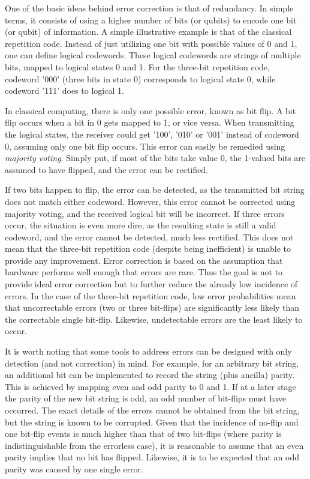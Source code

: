 One of the basic ideas behind error correction is that of redundancy. In simple terms, it consists of using a higher number of bits (or qubits) to encode one bit (or qubit) of information. A simple illustrative example is that of the classical repetition code. Instead of just utilizing one bit with possible values of 0 and 1, one can define logical codewords. These logical codewords are strings of multiple bits, mapped to logical states 0 and 1. For the three-bit repetition code, codeword '000' (three bits in state 0) corresponds to logical state 0, while codeword '111' does to logical 1. 

In classical computing, there is only one possible error, known as bit flip. A bit flip occurs when a bit in 0 gets mapped to 1, or vice versa. When transmitting the logical states, the receiver could get '100', '010' or '001' instead of codeword 0, assuming only one bit flip occurs. This error can easily be remedied using \textit{majority voting}. Simply put, if most of the bits take value 0, the 1-valued bits are assumed to have flipped, and the error can be rectified. 

If two bits happen to flip, the error can be detected, as the transmitted bit string does not match either codeword. However, this error cannot be corrected using majority voting, and the received logical bit will be incorrect. If three errors occur, the situation is even more dire, as the resulting state is still a valid codeword, and the error cannot be detected, much less rectified. This does not mean that the three-bit repetition code (despite being inefficient) is unable to provide any improvement. Error correction is based on the assumption that hardware performs well enough that errors are rare. Thus the goal is not to provide ideal error correction but to further reduce the already low incidence of errors. In the case of the three-bit repetition code, low error probabilities mean that uncorrectable errors (two or three bit-flips) are significantly less likely than the correctable single bit-flip. Likewise, undetectable errors are the least likely to occur. 

It is worth noting that some tools to address errors can be designed with only detection (and not correction) in mind. For example, for an arbitrary bit string, an additional bit can be implemented to record the string (plus ancilla) parity. This is achieved by mapping even and odd parity to 0 and 1. If at a later stage the parity of the new bit string is odd, an odd number of bit-flips must have occurred. The exact details of the errors cannot be obtained from the bit string, but the string is known to be corrupted. Given that the incidence of no-flip and one bit-flip events is much higher than that of two bit-flips (where parity is indistinguishable from the errorless case), it is reasonable to assume that an even parity implies that no bit has flipped. Likewise, it is to be expected that an odd parity was caused by one single error.

